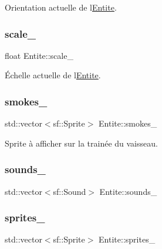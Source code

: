 Orientation actuelle de l\textquotesingle{}\mbox{\hyperlink{class_entite}{Entite}}. 

\mbox{\label{class_entite_a50e0f8c1188d9833432c55c7f7d2aa0f}} 
\subsubsection{\texorpdfstring{scale\+\_\+}{scale\_}}
{\footnotesize\ttfamily float Entite\+::scale\+\_\+\hspace{0.3cm}{\ttfamily [protected]}}



Échelle actuelle de l\textquotesingle{}\mbox{\hyperlink{class_entite}{Entite}}. 

\mbox{\label{class_entite_ad2082af5de01c6c55e74c7dcbfffee0b}} 
\subsubsection{\texorpdfstring{smokes\+\_\+}{smokes\_}}
{\footnotesize\ttfamily std\+::vector$<$sf\+::\+Sprite$>$ Entite\+::smokes\+\_\+\hspace{0.3cm}{\ttfamily [protected]}}



Sprite à afficher sur la trainée du vaisseau. 

\mbox{\label{class_entite_af5c5fcbcde3d33c2436b1d289cff125e}} 
\subsubsection{\texorpdfstring{sounds\+\_\+}{sounds\_}}
{\footnotesize\ttfamily std\+::vector$<$sf\+::\+Sound$>$ Entite\+::sounds\+\_\+\hspace{0.3cm}{\ttfamily [protected]}}

\mbox{\label{class_entite_a0f910cbb084753ee6ff64f102bc3e26c}} 
\subsubsection{\texorpdfstring{sprites\+\_\+}{sprites\_}}
{\footnotesize\ttfamily std\+::vector$<$sf\+::\+Sprite$>$ Entite\+::sprites\+\_\+\hspace{0.3cm}{\ttfamily [protected]}}



